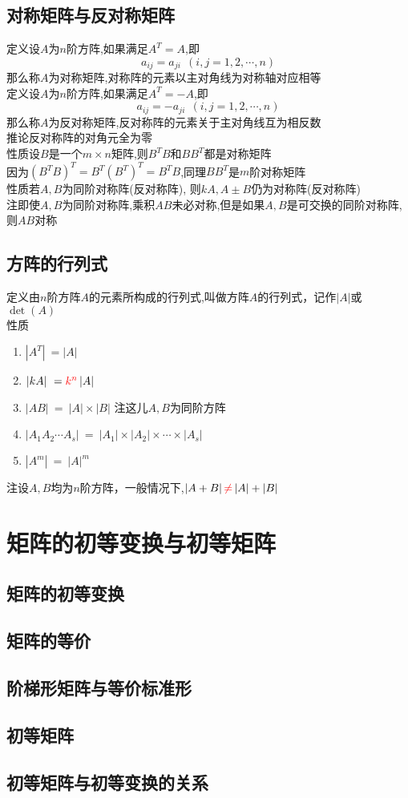 \subsection{对称矩阵与反对称矩阵}
{\color{red}定义\quad}设$A$为$n$阶方阵,如果满足$A^T=A$,即
$$
{{a}_{ij}}={{a}_{ji}}\ \ (i,j=1,2,\cdots ,n)
$$
那么称$A$为{\color{blue}对称矩阵},对称阵的元素以主对角线为对称轴对应相等\\
{\color{red}定义\quad}设$A$为$n$阶方阵,如果满足$A^T=-A$,即
$$
{{a}_{ij}}=-{{a}_{ji}}\ \ (i,j=1,2,\cdots ,n)
$$
那么称$A$为{\color{blue}反对称矩阵},反对称阵的元素关于主对角线互为相反数\\
{\color{blue}推论\quad}反对称阵的对角元全为零\\
{\color{blue}性质\quad}设$B$是一个$m\times n$矩阵,则$B^TB$和$BB^T$都是对称矩阵\\
因为$(B^TB)^T=B^T(B^T)^T=B^TB$,同理$BB^T$是$m$阶对称矩阵\\
{\color{blue}性质\quad}若$A,B$为同阶对称阵(反对称阵), 则$kA,A\pm B$仍为对称阵(反对称阵)\\
{\color{blue}注\quad}即使$A,B$为同阶对称阵,乘积$AB$未必对称,但是如果$A,B$是可交换的同阶对称阵,则$AB$对称
\subsection{方阵的行列式}
{\color{red}定义\quad}由$n$阶方阵$A$的元素所构成的行列式,叫做方阵$A$的行列式，记作$|A|$或$\det{(A)}$ \\
{\color{blue}性质\quad}
\begin{enumerate}
    \item{
        $\left| {{A}^{T}} \right|\ =\left| A \right|$
    }
    \item{
        $\left| kA \right|\ ={\color{red}{k}^{n}}\left| A \right|$
    }
    \item{
        $\left| AB \right|\ =\ \left| A \right|\times \left| B \right|$
        {\color{red}注\quad}这儿$A,B$为同阶方阵
    }
    \item{
        $\left| {{A}_{1}}{{A}_{2}}\cdots {{A}_{s}} \right|\ =\ \left| {{A}_{1}} \right|\times \left| {{A}_{2}} \right|\times \cdots \times \left| {{A}_{s}} \right|$
    }
    \item{
        $\left| {{A}^{m}} \right|\ =\ {{\left| A \right|}^{m}}$
    }
\end{enumerate}
{\color{red}注\quad}设$A,B$均为{\color{red}$n$阶方阵}，一般情况下,$\left|A+B \right|{\color{red}\neq}\left|A\right|+\left|B\right|$
\section{矩阵的初等变换与初等矩阵}
\subsection{矩阵的初等变换}
\subsection{矩阵的等价}
\subsection{阶梯形矩阵与等价标准形}
\subsection{初等矩阵}
\subsection{初等矩阵与初等变换的关系}